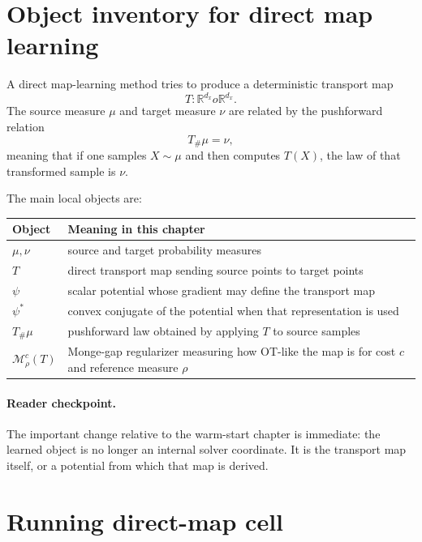 \section{Object inventory for direct map learning}
\label{sec:bf-neural-ot-direct-object}

A direct map-learning method tries to produce a deterministic transport map
\begin{equation}
\label{eq:bf-neural-ot-direct-map-object}
  T:
  \mathbb R^{d_x}	o\mathbb R^{d_x}.
\end{equation}
The source measure \(\mu\) and target measure \(\nu\) are related by the
pushforward relation
\begin{equation}
\label{eq:bf-neural-ot-direct-pushforward}
  T_\#\mu = \nu,
\end{equation}
meaning that if one samples \(X\sim\mu\) and then computes \(T(X)\), the law of
that transformed sample is \(\nu\).

The main local objects are:
\begin{center}
\small
\begin{tabular}{p{} p{}}
\toprule
Object & Meaning in this chapter \\
\midrule
$\mu,\nu$ & source and target probability measures \\
$T$ & direct transport map sending source points to target points \\
$\psi$ & scalar potential whose gradient may define the transport map \\
$\psi^*$ & convex conjugate of the potential when that representation is used \\
$T_\#\mu$ & pushforward law obtained by applying $T$ to source samples \\
$\mathcal M_\rho^c(T)$ & Monge-gap regularizer measuring how OT-like the map is for cost $c$ and reference measure $\rho$ \\
\bottomrule
\end{tabular}
\end{center}

\paragraph{Reader checkpoint.}
The important change relative to the warm-start chapter is immediate: the learned
object is no longer an internal solver coordinate.  It is the transport map
itself, or a potential from which that map is derived.

\section{Running direct-map cell}
\label{sec:bf-neural-ot-direct-running-cell}


